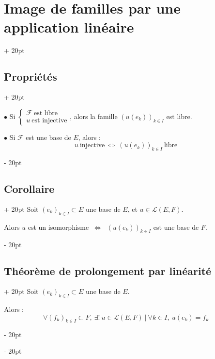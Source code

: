 \documentclass[a4paper, 12pt, twoside]{article}
\newcommand{\ssi}{\ \Leftrightarrow \ }
\newcommand{\ind}[1][20pt]{\advance\leftskip + #1}
\newcommand{\deind}[1][20pt]{\advance\leftskip - #1}
\newenvironment{indt}[2][20pt]{#2 \par \ind[#1]}{\par \deind} %
\begin{document}
\begin{indt}{\section{Image de familles par une application linéaire}}
\begin{indt}{\subsection{Propriétés}}
            \vspace{6pt}
            
            $\bullet$ Si
            $
                \begin{cases}
                    \mathcal F\ \text{est libre}
                    \\
                    u\ \text{est injective}
                \end{cases}
            $, alors la famille $(u(e_k))_{k \in I}$ est libre.

            \vspace{6pt}
            
            $\bullet$ Si $\mathcal F$ est une base de $E$, alors :
            \[
                u\ \text{injective} \ssi (u(e_k))_{k \in I}\ \text{libre}
            \]
        \end{indt}

        \vspace{12pt}
        
        \begin{indt}{\subsection{Corollaire}}
            Soit $(e_k)_{k \in I} \subset E$ une base de $E$, et $u \in \mathcal L(E, F)$.

            Alors $u$ est un isomorphisme $\ssi$ $(u(e_k))_{k \in I}$ est une base de $F$.
        \end{indt}

        \vspace{12pt}
        
        \begin{indt}{\subsection{Théorème de prolongement par linéarité}}
            Soit $(e_k)_{k \in I} \subset E$ une base de $E$.

            Alors :
            \[
                \forall (f_k)_{k \in I} \subset F,\
                \exists!\: u \in \mathcal L(E, F)\ |\
                \forall k \in I,\ u(e_k) = f_k
            \]
        \end{indt}
    \end{indt}

    \vspace{12pt}
    
\end{document}
